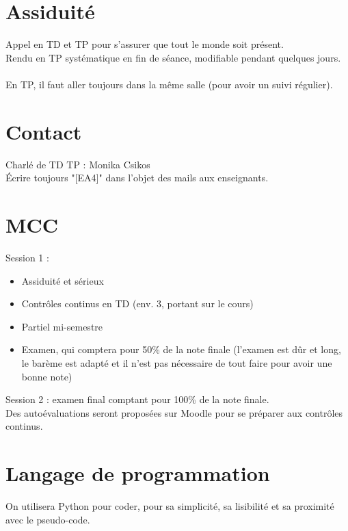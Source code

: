 \documentclass{article}
\begin{document}

\section{Assiduité}

Appel en TD et TP pour s'assurer que tout le monde soit présent.\\
Rendu en TP systématique en fin de séance, modifiable pendant quelques jours.\\\\

\noindent En TP, il faut aller toujours dans la même salle (pour avoir un suivi régulier).

\section{Contact}
Charlé de TD TP : Monika Csikos\\
Écrire toujours "[EA4]" dans l'objet des mails aux enseignants.

\section{MCC}

Session 1 :
\begin{itemize}
    \item Assiduité et sérieux
    \item Contrôles continus  en TD (env. 3, portant sur le cours)
    \item Partiel mi-semestre
    \item Examen, qui comptera pour 50\% de la note finale (l'examen est dûr et long, le barème est adapté et il n'est pas nécessaire de tout faire pour avoir une bonne note)
\end{itemize}

\noindent Session 2 : examen final comptant pour 100\% de la note finale.\\
Des autoévaluations seront proposées sur Moodle pour se préparer aux contrôles continus.

\section{Langage de programmation}
On utilisera Python pour coder, pour sa simplicité, sa lisibilité et sa proximité avec le pseudo-code.
\end{document}
